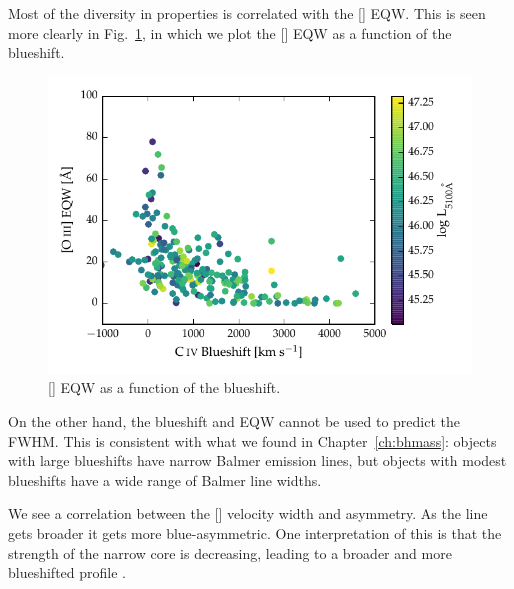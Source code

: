 Most of the diversity in  properties is correlated with the [] EQW. 
This is seen more clearly in Fig.~\ref{fig:civ_blueshift_oiii_eqw}, in which we plot the [] EQW as a function of the  blueshift. 

\begin{figure}
    \centering
    \includegraphics[width=\columnwidth]{figures/chapter04/civ_blueshift_oiii_eqw.pdf} 
    \caption[{[] EQW as a function of the  blueshift.}]{[] EQW as a function of the  blueshift.}     
    \label{fig:civ_blueshift_oiii_eqw}
\end{figure}


On the other hand, the  blueshift and EQW cannot be used to predict the \hb FWHM. 
This is consistent with what we found in Chapter~\ref{ch:bhmass}: objects with large  blueshifts have narrow Balmer emission lines, but objects with modest  blueshifts have a wide range of Balmer line widths. 

We see a correlation between the [] velocity width and asymmetry. 
As the line gets broader it gets more blue-asymmetric. 
One interpretation of this is that the strength of the narrow core is decreasing, leading to a broader and more blueshifted profile \citep[e.g.][]{shen14}. 

